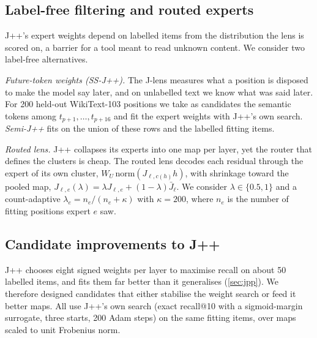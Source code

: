 \documentclass[11pt]{article}
\theoremstyle{definition}
\begin{document}
\subsection{Label-free filtering and routed experts}
\label{sec:labelfree}

J++'s expert weights depend on labelled items from the distribution the lens is scored on, a barrier
for a tool meant to read unknown content. We consider two label-free alternatives.

\emph{Future-token weights (SS-J++).} The J-lens measures what a position is disposed to make the model
say later, and on unlabelled text we know what was said later. For 200 held-out WikiText-103
\citep{merity2016wikitext} positions we take as candidates the semantic tokens among
$t_{p+1},\dots,t_{p+16}$ and fit the expert weights with J++'s own search. \emph{Semi-J++} fits on the
union of these rows and the labelled fitting items.

\emph{Routed lens.} J++ collapses its experts into one map per layer, yet the router that defines the
clusters is cheap. The routed lens decodes each residual through the expert of its own cluster,
$W_U\,\mathrm{norm}(J_{\ell,c(h)} h)$, with shrinkage toward the pooled map,
$J_{\ell,e}(\lambda)=\lambda J_{\ell,e}+(1-\lambda)\bar J_\ell$. We consider $\lambda\in\{0.5,1\}$ and
a count-adaptive $\lambda_e=n_e/(n_e+\kappa)$ with $\kappa=200$, where $n_e$ is the number of fitting
positions expert $e$ saw.

\subsection{Candidate improvements to J++}
\label{sec:candidates}

J++ chooses eight signed weights per layer to maximise recall on about 50 labelled items, and fits
them far better than it generalises (\cref{sec:jpp}). We therefore designed candidates that either
stabilise the weight search or feed it better maps. All use J++'s own search (exact recall@10 with a
sigmoid-margin surrogate, three starts, 200 Adam steps) on the same fitting items, over maps scaled to
unit Frobenius norm.
\end{document}
